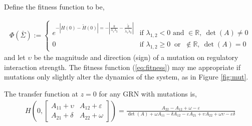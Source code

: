 \documentclass[11 pt]{article}
\newcommand{\pda}{\frac{\partial}{\partial A_{ij}}}
\begin{document}
Define the fitness function to be,

\begin{align}\label{eq:fitness}
  \Phi(\bar{\Sigma}) := \left\{ \begin{array}{ll}   e^{- \left| H(0) - \tilde{H}(0) \right| = - \left| \frac{k}{\lambda_{1} \lambda_{2}} - \frac{\tilde{k}}{\tilde{\lambda}_{1} \tilde{\lambda}_{2}} \right|}    &\text{if } \lambda_{1,2} < 0 \text{ and } \in \mathbb{R}, \ \det(A) \neq 0 \\
  0   &\text{if } \lambda_{1,2} \geq 0 \ \text{ or } \ \notin \mathbb{R}, \ \det(A) = 0 \end{array} \right.
\end{align}
and let $\upsilon$ be the magnitude and direction (sign) of a mutation on regulatory interaction strength. The fitness function (\ref{eq:fitness}) may me appropriate if mutations only slightly alter the dynamics of the system, as in Figure \ref{fig:mut}.

%
%
 The transfer function at $z=0$ for any GRN with mutations is, 
  \begin{align*}
    H(0, \begin{bmatrix} A_{11} + \upsilon & A_{12} + \varepsilon \\ A_{21} + \delta & A_{22} + \omega \end{bmatrix}) = \frac{A_{22} - A_{12} + \omega - \varepsilon}{ \det(A) + \omega A_{11} - \delta A_{12} - \varepsilon A_{21} + \upsilon A_{22} + \omega \upsilon - \varepsilon \delta }
  \end{align*}
\end{document}
